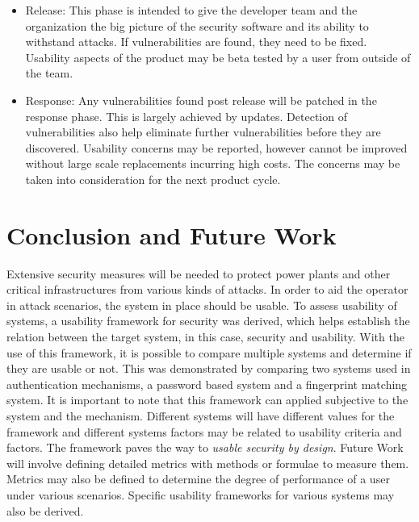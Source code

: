 \begin{itemize}
\item Release: This phase is intended to give the developer team and the organization the big picture of the security software and its ability to withstand attacks. If vulnerabilities are found, they need to be fixed. Usability aspects of the product may be beta tested by a user from outside of the team.

\item Response: Any vulnerabilities found post release will be patched in the response phase. This is largely achieved by updates. Detection of vulnerabilities also help eliminate further vulnerabilities before they are discovered. Usability concerns may be reported, however cannot be improved without large scale replacements incurring high costs. The concerns may be taken into consideration for the next product cycle.
\end{itemize} 



\section{Conclusion and Future Work}
Extensive security measures will be needed to protect power plants and other critical infrastructures from various kinds of attacks. In order to aid the operator in attack scenarios, the system in place should be usable. To assess usability of systems, a usability framework for security was derived, which helps establish the relation between the target system, in this case, security and usability.  With the use of this framework, it is possible to compare multiple systems and determine if they are usable or not. This was demonstrated by comparing two systems used in authentication mechanisms, a password based system and a fingerprint matching system. It is important to note that this framework can applied subjective to the system and the mechanism. Different systems will have different values for the framework and different systems factors may be related to usability criteria and factors. The framework paves the way to \textit{usable security by design}. Future Work will involve defining detailed metrics with methods or formulae to measure them. Metrics may also be defined to determine the degree of performance of a user under various scenarios. Specific usability frameworks for various systems may also be derived.

